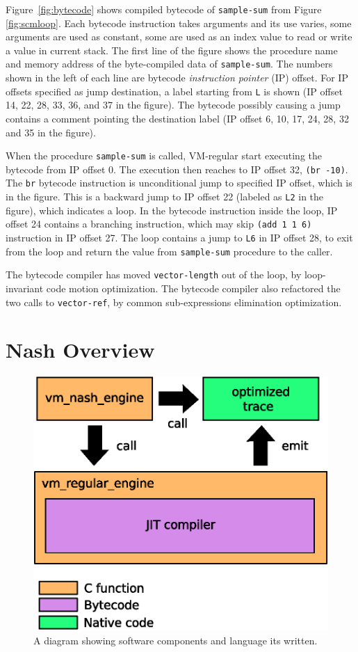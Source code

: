 \documentclass[preprint, numbers]{sigplanconf}
\begin{document}
Figure~\hyperref[fig:bytecode]{\ref{fig:bytecode}} shows compiled bytecode of
\texttt{sample-sum} from Figure~
\hyperref[fig:scmloop]{\ref{fig:scmloop}}. Each bytecode instruction takes
arguments and its use varies, some arguments are used as constant, some are
used as an index value to read or write a value in current stack. The first
line of the figure shows the procedure name and memory address of the
byte-compiled data of \texttt{sample-sum}. The numbers shown in the left of
each line are bytecode \textit{instruction pointer} (IP) offset. For IP
offsets specified as jump destination, a label starting from \texttt{L} is
shown (IP offset 14, 22, 28, 33, 36, and 37 in the figure). The bytecode
possibly causing a jump contains a comment pointing the destination label (IP
offset 6, 10, 17, 24, 28, 32 and 35 in the figure).

When the procedure \texttt{sample-sum} is called, VM-regular start executing
the bytecode from IP offset 0. The execution then reaches to IP offset 32,
\texttt{(br -10)}. The \texttt{br} bytecode instruction is unconditional jump
to specified IP offset, which is  in the figure. This is a backward jump to
IP offset 22 (labeled as \texttt{L2} in the figure), which indicates a
loop. In the bytecode instruction inside the loop, IP offset 24 contains a
branching instruction, which may skip \texttt{(add 1 1 6)} instruction in IP
offset 27. The loop contains a jump to \texttt{L6} in IP offset 28, to exit
from the loop and return the value from \texttt{sample-sum} procedure to the
caller.

The bytecode compiler has moved \texttt{vector-length} out of the loop, by
loop-invariant code motion optimization. The bytecode compiler also refactored
the two calls to \texttt{vector-ref}, by common sub-expressions elimination
optimization.

\section{Nash Overview}
\label{sec:overview}


\begin{figure}
  \centering \includegraphics[width=0.4 \textwidth]{overview}
  \caption{A diagram showing software components and language its written.}
  \label{fig:overview}
\end{figure}
\end{document}
